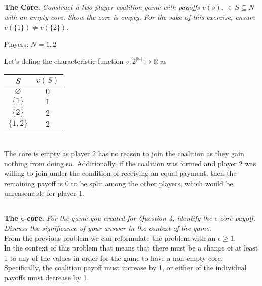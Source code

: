 \documentclass[12pt]{amsart}
\begin{document}
\begin{center}
\end{center}

\subsection{}
\textbf{The Core.} 
\textit{Construct a two-player coalition game with payoffs $v(s),\ \in S \subseteq N$ with an empty core. 
	Show the core is empty. For the sake of this exercise, ensure $v(\{1\}) \neq v(\{2\})$.}

Players: $N={1,2}$

Let's define the characteristic function 
$v:2^{|\mathbb N|} \mapsto \mathbb R$ as \\

\begin{tabular}{c|c}
	$S$ & $v(S)$ \\
	\midrule
	$\varnothing$ & $0$ \\
	$\{1\}$ & $1$ \\
	$\{2\}$ & $2$ \\
	$\{1,2\}$ & $2$ \\
\end{tabular} \\

The core is empty as player 2 has no reason to join the coalition as they gain nothing from doing so.
Additionally, if the coalition was formed and player 2 was willing to join under the condition of receiving
an equal payment, then the remaining payoff is 0 to be split among the other players, 
which would be unreasonable for player 1.

\subsection{}
\textbf{The $\boldsymbol\epsilon$-core.} 
\textit{For the game you created for Question 4, identify the $\epsilon$-core payoff. 
	Discuss the significance of your answer in the context of the game.} \\

From the previous problem we can reformulate the problem with an $\epsilon\geq1$. \\

In the context of this problem that means that there must be a change of at least 1 to any of the values in order for the game to have a non-empty core.
Specifically, the coalition payoff must increase by 1, or either of the individual payoffs must decrease by 1.
\end{document}
